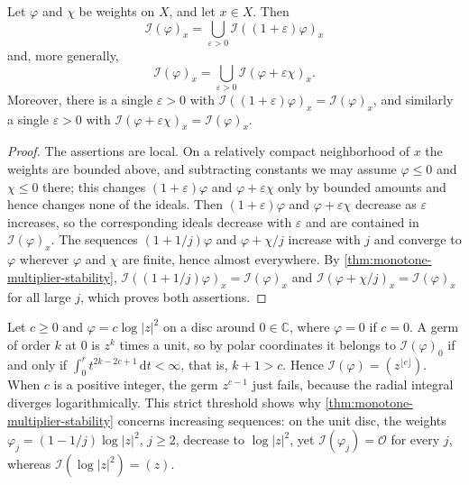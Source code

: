 \begin{corollary}\label{cor:strong-openness}
Let $\varphi$ and $\chi$ be weights on $X$, and let $x\in X$. Then
\begin{equation}\label{eq:strong-openness}
 \mathcal I(\varphi)_x=\bigcup_{\varepsilon>0}
                   \mathcal I((1+\varepsilon)\varphi)_x
\end{equation}
and, more generally,
\[
 \mathcal I(\varphi)_x=\bigcup_{\varepsilon>0}
                   \mathcal I(\varphi+\varepsilon\chi)_x.
\]
Moreover, there is a single $\varepsilon>0$ with $\mathcal I((1+\varepsilon)\varphi)_x=\mathcal I(\varphi)_x$, and similarly a single $\varepsilon>0$ with $\mathcal I(\varphi+\varepsilon\chi)_x=\mathcal I(\varphi)_x$.
\end{corollary}
\begin{proof}
The assertions are local. On a relatively compact neighborhood of $x$ the weights are bounded above, and subtracting constants we may assume $\varphi\leq0$ and $\chi\leq0$ there; this changes $(1+\varepsilon)\varphi$ and $\varphi+\varepsilon\chi$ only by bounded amounts and hence changes none of the ideals. Then $(1+\varepsilon)\varphi$ and $\varphi+\varepsilon\chi$ decrease as $\varepsilon$ increases, so the corresponding ideals decrease with $\varepsilon$ and are contained in $\mathcal I(\varphi)_x$. The sequences $(1+1/j)\varphi$ and $\varphi+\chi/j$ increase with $j$ and converge to $\varphi$ wherever $\varphi$ and $\chi$ are finite, hence almost everywhere. By \cref{thm:monotone-multiplier-stability}, $\mathcal I((1+1/j)\varphi)_x=\mathcal I(\varphi)_x$ and $\mathcal I(\varphi+\chi/j)_x=\mathcal I(\varphi)_x$ for all large $j$, which proves both assertions.
\end{proof}

\begin{example}\label{ex:multiplier-monomial-threshold}
Let $c\geq0$ and $\varphi=c\log|z|^2$ on a disc around $0\in\mathbb C$, where $\varphi=0$ if $c=0$. A germ of order $k$ at $0$ is $z^k$ times a unit, so by polar coordinates it belongs to $\mathcal I(\varphi)_0$ if and only if $\int_0^rt^{2k-2c+1}\,\mathrm dt<\infty$, that is, $k+1>c$. Hence $\mathcal I(\varphi)=(z^{\lfloor c\rfloor})$. When $c$ is a positive integer, the germ $z^{c-1}$ just fails, because the radial integral diverges logarithmically. This strict threshold shows why \cref{thm:monotone-multiplier-stability} concerns increasing sequences: on the unit disc, the weights $\varphi_j=(1-1/j)\log|z|^2$, $j\geq2$, decrease to $\log|z|^2$, yet $\mathcal I(\varphi_j)=\mathcal O$ for every $j$, whereas $\mathcal I(\log|z|^2)=(z)$.
\end{example}

